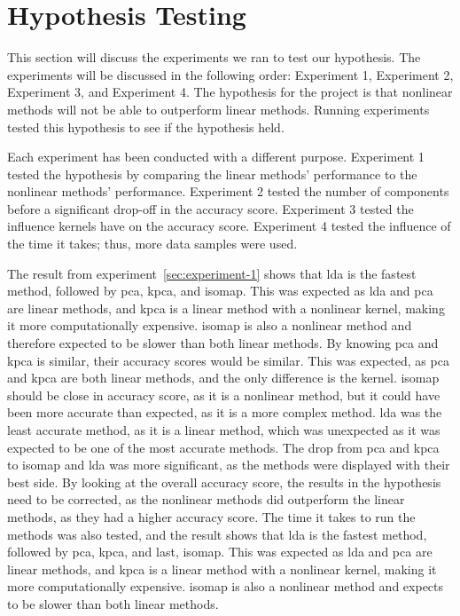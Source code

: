 \section{Hypothesis Testing} \label{sec:experiments}
This section will discuss the experiments we ran to test our hypothesis. The experiments will be discussed in the following order: Experiment 1, Experiment 2, Experiment 3, and Experiment 4. The hypothesis for the project is that nonlinear methods will not be able to outperform linear methods. Running experiments tested this hypothesis to see if the hypothesis held. 

Each experiment has been conducted with a different purpose. Experiment 1 tested the hypothesis by comparing the linear methods' performance to the nonlinear methods' performance. Experiment 2 tested the number of components before a significant drop-off in the accuracy score. Experiment 3 tested the influence kernels have on the accuracy score. Experiment 4 tested the influence of the time it takes; thus, more data samples were used.

The result from experiment~\ref{sec:experiment-1} shows that \gls{lda} is the fastest method, followed by \gls{pca}, \gls{kpca}, and \gls{isomap}. This was expected as \gls{lda} and \gls{pca} are linear methods, and \gls{kpca} is a linear method with a nonlinear kernel, making it more computationally expensive. \gls{isomap} is also a nonlinear method and therefore expected to be slower than both linear methods. By knowing \gls{pca} and \gls{kpca} is similar, their accuracy scores would be similar. This was expected, as \gls{pca} and \gls{kpca} are both linear methods, and the only difference is the kernel. \gls{isomap} should be close in accuracy score, as it is a nonlinear method, but it could have been more accurate than expected, as it is a more complex method. \gls{lda} was the least accurate method, as it is a linear method, which was unexpected as it was expected to be one of the most accurate methods. The drop from \gls{pca} and \gls{kpca} to \gls{isomap} and \gls{lda} was more significant, as the methods were displayed with their best side. By looking at the overall accuracy score, the results in the hypothesis need to be corrected, as the nonlinear methods did outperform the linear methods, as they had a higher accuracy score. The time it takes to run the methods was also tested, and the result shows that \gls{lda} is the fastest method, followed by \gls{pca}, \gls{kpca}, and last, \gls{isomap}. This was expected as \gls{lda} and \gls{pca} are linear methods, and \gls{kpca} is a linear method with a nonlinear kernel, making it more computationally expensive. \gls{isomap} is also a nonlinear method and expects to be slower than both linear methods.



